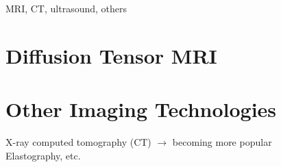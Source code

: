 MRI, CT, ultrasound, others \\

\section{Diffusion Tensor MRI}
\label{Diffusion Tensor MRI}

\section{Other Imaging Technologies}
\label{Other Imaging Technologies}
X-ray computed tomography (CT) $\rightarrow$ becoming more popular \\
Elastography, etc.
